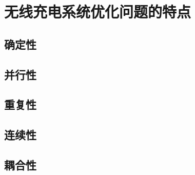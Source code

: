 \documentclass[index]{subfiles}
\begin{document}
\chapter{无线充电系统优化问题的特点}
\section{确定性}
\section{并行性}
\section{重复性}
\section{连续性}
\section{耦合性}
\end{document}
